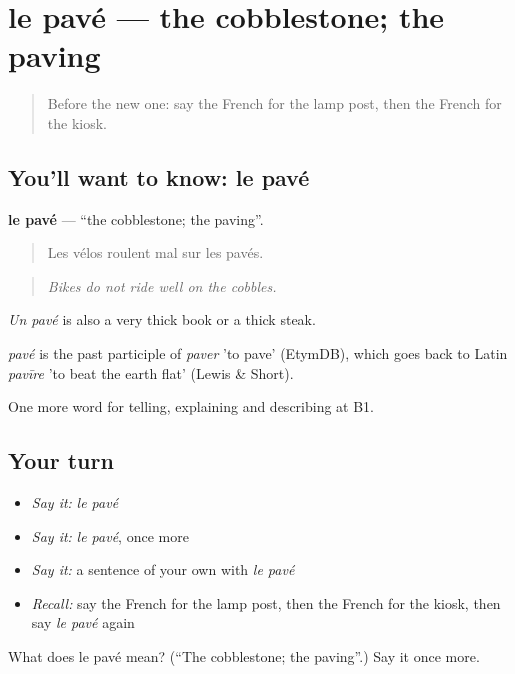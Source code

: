 \section[le pavé]{le pavé — the cobblestone; the paving}

\label{lesson:FR-C441-pave}



\begin{quote}
Before the new one: say the French for the lamp post, then the French for the kiosk.
\end{quote}

\subsection*{You'll want to know: le pavé}
\textbf{le pavé} — \textquotedblleft{}the cobblestone; the paving\textquotedblright{}.

\begin{quote}
Les vélos roulent mal sur les pavés.
\end{quote}

\begin{quote}
\emph{Bikes do not ride well on the cobbles.}
\end{quote}

\emph{Un pavé} is also a very thick book or a thick steak.

\begin{cousinweb}
\emph{pavé} is the past participle of \emph{paver} 'to pave' (EtymDB), which goes back to Latin \emph{pavīre} 'to beat the earth flat' (Lewis \& Short).
\end{cousinweb}

\begin{grammarlens}[title={What you've built}]
One more word for telling, explaining and describing at B1.
\end{grammarlens}

\subsection*{Your turn}
\begin{itemize}
\raggedright
  \item \emph{Say it:} \emph{le pavé}
  \item \emph{Say it:} \emph{le pavé}, once more
  \item \emph{Say it:} a sentence of your own with \emph{le pavé}
  \item \emph{Recall:} say the French for the lamp post, then the French for the kiosk, then say \emph{le pavé} again
\end{itemize}

\begin{tcolorbox}[breakable,colback=teal!4,colframe=teal!35!black,title={Before you move on}]
What does le pavé mean? (\textquotedblleft{}The cobblestone; the paving\textquotedblright{}.) Say it once more.
\end{tcolorbox}
